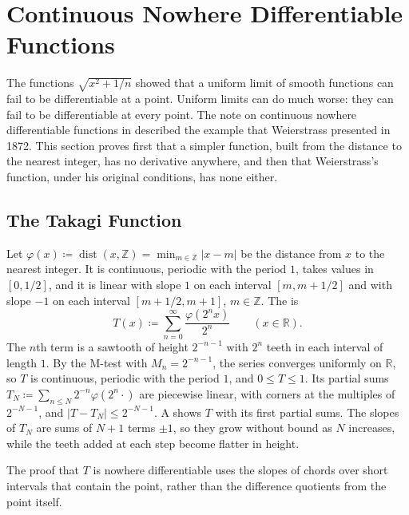 \section{Continuous Nowhere Differentiable Functions}
\label{sec:nowhere-differentiable}

The functions $\sqrt{x^2+1/n}$ showed that a uniform limit of smooth functions can fail to be differentiable at a point. Uniform limits can do much worse: they can fail to be differentiable at every point. The note on continuous nowhere differentiable functions in  described the example that Weierstrass presented in 1872. This section proves first that a simpler function, built from the distance to the nearest integer, has no derivative anywhere, and then that Weierstrass's function, under his original conditions, has none either.

\subsection{The Takagi Function}

Let $\varphi(x)\coloneqq\operatorname{dist}(x,\mathbb Z)=\min_{m\in\mathbb Z}|x-m|$ be the distance from $x$ to the nearest integer. It is continuous, periodic with the period $1$, takes values in $[0,1/2]$, and it is linear with slope $1$ on each interval $[m,m+1/2]$ and with slope $-1$ on each interval $[m+1/2,m+1]$, $m\in\mathbb Z$. The  is
\begin{equation}
T(x)\coloneqq\sum_{n=0}^\infty\frac{\varphi(2^nx)}{2^n}\qquad(x\in\mathbb R).
\label{eq:takagi}
\end{equation}
The $n$th term is a sawtooth of height $2^{-n-1}$ with $2^n$ teeth in each interval of length $1$. By the M-test with $M_n=2^{-n-1}$, the series converges uniformly on $\mathbb R$, so $T$ is continuous, periodic with the period $1$, and $0\le T\le1$. Its partial sums $T_N\coloneqq\sum_{n\le N}2^{-n}\varphi(2^n\cdot)$ are piecewise linear, with corners at the multiples of $2^{-N-1}$, and $|T-T_N|\le2^{-N-1}$. A shows $T$ with its first partial sums. The slopes of $T_N$ are sums of $N+1$ terms $\pm1$, so they grow without bound as $N$ increases, while the teeth added at each step become flatter in height.

The proof that $T$ is nowhere differentiable uses the slopes of chords over short intervals that contain the point, rather than the difference quotients from the point itself.


